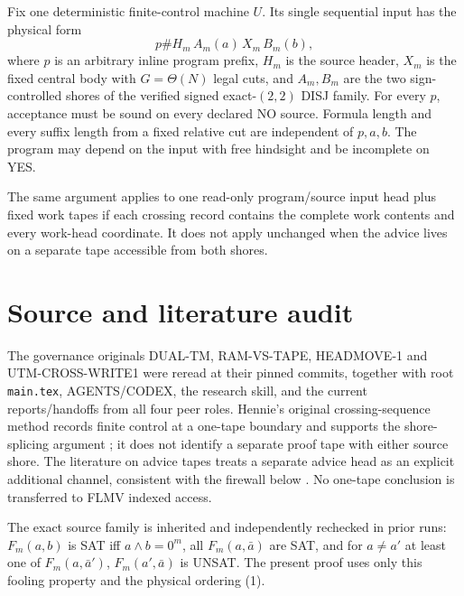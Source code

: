 \documentclass[11pt]{article}
\begin{document}
Fix one deterministic finite-control machine $U$.  Its single sequential input has the physical form
\[
       p\#H_m\,A_m(a)\,X_m\,B_m(b),                 \tag{1}
\]
where $p$ is an arbitrary inline program prefix, $H_m$ is the source header, $X_m$ is the fixed central body with $G=\Theta(N)$ legal cuts, and $A_m,B_m$ are the two sign-controlled shores of the verified signed exact-$(2,2)$ DISJ family.  For every $p$, acceptance must be sound on every declared NO source.  Formula length and every suffix length from a fixed relative cut are independent of $p,a,b$.  The program may depend on the input with free hindsight and be incomplete on YES.

The same argument applies to one read-only program/source input head plus fixed work tapes if each crossing record contains the complete work contents and every work-head coordinate.  It does not apply unchanged when the advice lives on a separate tape accessible from both shores.

\section{Source and literature audit}
The governance originals DUAL-TM, RAM-VS-TAPE, HEADMOVE-1 and UTM-CROSS-WRITE1 were reread at their pinned commits, together with root \texttt{main.tex}, AGENTS/CODEX, the research skill, and the current reports/handoffs from all four peer roles.  Hennie's original crossing-sequence method records finite control at a one-tape boundary and supports the shore-splicing argument \cite{hennie}; it does not identify a separate proof tape with either source shore.  The literature on advice tapes treats a separate advice head as an explicit additional channel, consistent with the firewall below \cite{advice}.  No one-tape conclusion is transferred to FLMV indexed access.

The exact source family is inherited and independently rechecked in prior runs: $F_m(a,b)$ is SAT iff $a\wedge b=0^m$, all $F_m(a,\bar a)$ are SAT, and for $a\ne a'$ at least one of $F_m(a,\bar a')$, $F_m(a',\bar a)$ is UNSAT.  The present proof uses only this fooling property and the physical ordering (1).
\end{document}
